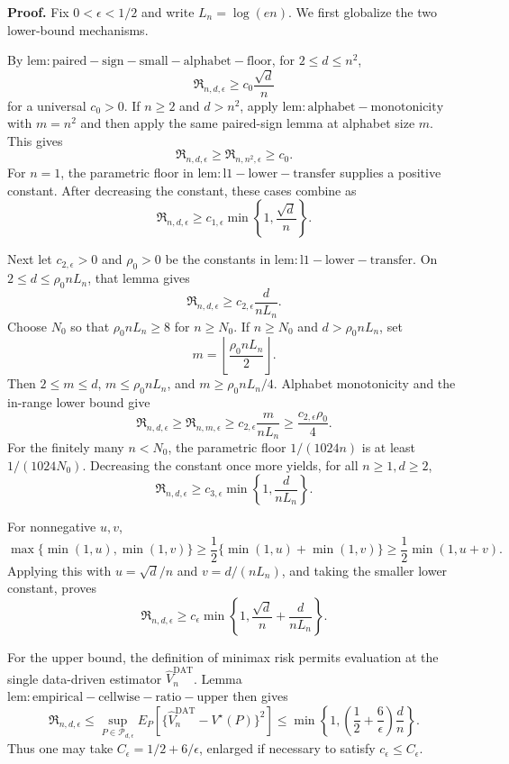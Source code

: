 \textbf{Proof.}
Fix \(0<\epsilon<1/2\) and write \(L_n=\log(en)\).  We first globalize the two lower-bound mechanisms.

By \(\mathrm{lem:paired-sign-small-alphabet-floor}\), for \(2\le d\le n^2\),
\[
 \mathfrak R_{n,d,\epsilon}\ge c_0\frac{\sqrt d}{n}
\]
for a universal \(c_0>0\).  If \(n\ge2\) and \(d>n^2\), apply \(\mathrm{lem:alphabet-monotonicity}\) with \(m=n^2\) and then apply the same paired-sign lemma at alphabet size \(m\).  This gives
\[
 \mathfrak R_{n,d,\epsilon}
 \ge\mathfrak R_{n,n^2,\epsilon}\ge c_0.
\]
For \(n=1\), the parametric floor in \(\mathrm{lem:l1-lower-transfer}\) supplies a positive constant.  After decreasing the constant, these cases combine as
\[
 \mathfrak R_{n,d,\epsilon}
 \ge c_{1,\epsilon}\min\left\{1,\frac{\sqrt d}{n}\right\}.
\]

Next let \(c_{2,\epsilon}>0\) and \(\rho_0>0\) be the constants in \(\mathrm{lem:l1-lower-transfer}\).  On \(2\le d\le\rho_0nL_n\), that lemma gives
\[
 \mathfrak R_{n,d,\epsilon}
 \ge c_{2,\epsilon}\frac d{nL_n}.
\]
Choose \(N_0\) so that \(\rho_0nL_n\ge8\) for \(n\ge N_0\).  If \(n\ge N_0\) and \(d>\rho_0nL_n\), set
\[
 m=\left\lfloor\frac{\rho_0nL_n}{2}\right\rfloor.
\]
Then \(2\le m\le d\), \(m\le\rho_0nL_n\), and \(m\ge\rho_0nL_n/4\).  Alphabet monotonicity and the in-range lower bound give
\[
 \mathfrak R_{n,d,\epsilon}
 \ge\mathfrak R_{n,m,\epsilon}
 \ge c_{2,\epsilon}\frac m{nL_n}
 \ge\frac{c_{2,\epsilon}\rho_0}{4}.
\]
For the finitely many \(n<N_0\), the parametric floor \(1/(1024n)\) is at least \(1/(1024N_0)\).  Decreasing the constant once more yields, for all \(n\ge1,d\ge2\),
\[
 \mathfrak R_{n,d,\epsilon}
 \ge c_{3,\epsilon}\min\left\{1,\frac d{nL_n}\right\}.
\]

For nonnegative \(u,v\),
\[
 \max\{\min(1,u),\min(1,v)\}
 \ge\frac12\{\min(1,u)+\min(1,v)\}
 \ge\frac12\min(1,u+v).
\]
Applying this with \(u=\sqrt d/n\) and \(v=d/(nL_n)\), and taking the smaller lower constant, proves
\[
 \mathfrak R_{n,d,\epsilon}
 \ge c_\epsilon\min\left\{1,
   \frac{\sqrt d}{n}+\frac d{nL_n}
 \right\}.
\]

For the upper bound, the definition of minimax risk permits evaluation at the single data-driven estimator \(\widehat V_n^{\mathrm{DAT}}\).  Lemma \(\mathrm{lem:empirical-cellwise-ratio-upper}\) then gives
\[
 \mathfrak R_{n,d,\epsilon}
 \le\sup_{P\in\mathcal P_{d,\epsilon}}
 E_P\left[
   \{\widehat V_n^{\mathrm{DAT}}-V^\star(P)\}^2
 \right]
 \le\min\left\{1,
  \left(\frac12+\frac6\epsilon\right)\frac dn
 \right\}.
\]
Thus one may take \(C_\epsilon=1/2+6/\epsilon\), enlarged if necessary to satisfy \(c_\epsilon\le C_\epsilon\).

